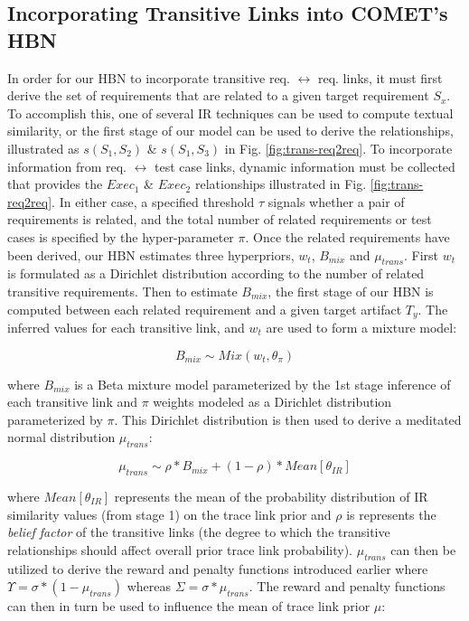 \subsection{\textbf{Incorporating Transitive Links into C{\footnotesize OMET}'s HBN}} In order for our HBN to incorporate transitive req. $\leftrightarrow$ req. links, it must first derive the set of requirements that are related to a given target requirement $S_x$. To accomplish this, one of several IR techniques can be used to compute textual similarity, or the first stage of our model can be used to derive the relationships, illustrated as $s(S_1,S_2)$ \& $s(S_1,S_3)$ in Fig. \ref{fig:trans-req2req}. To incorporate information from req. $\leftrightarrow$ test case links, dynamic information must be collected that provides the $Exec_1$ \& $Exec_2$ relationships illustrated in Fig. \ref{fig:trans-req2req}. In either case, a specified threshold $\tau$ signals whether a pair of requirements is related, and the total number of related requirements or test cases is specified by the hyper-parameter $\pi$.  Once the related requirements have been derived, our HBN estimates three hyperpriors, $w_t$, $B_{mix}$ and $\mu_{trans}$. First $w_t$ is formulated as a Dirichlet distribution according to the number of related transitive requirements. Then to estimate $B_{mix}$, the first stage of our HBN is computed between each related requirement and a given target artifact $T_y$. The inferred values for each transitive link, and $w_t$ are used to form a mixture model:

\begin{equation}
	B_{mix} \sim Mix(w_t,\theta_\pi)
\end{equation}

\noindent where $B_{mix}$ is a Beta mixture model parameterized by the 1st stage inference of each transitive link and $\pi$ weights modeled as a Dirichlet distribution parameterized by $\pi$. This Dirichlet distribution is then used to derive a meditated normal distribution $\mu_{trans}$:

\begin{equation}
	\mu_{trans} \sim \rho*B_{mix} + (1-\rho)*Mean[\theta_{IR}]
\end{equation}

\noindent where $Mean[\theta_{IR}]$ represents the mean of the probability distribution of IR similarity values (from stage 1) on the trace link prior and $\rho$ is represents the \textit{belief factor} of the transitive links (\eg the degree to which the transitive relationships should affect overall prior trace link probability). $\mu_{trans}$ can then be utilized to derive the reward and penalty functions introduced earlier where $\Upsilon = \sigma*(1-\mu_{trans})$ whereas $\Sigma = \sigma*\mu_{trans}$. The reward and penalty functions can then in turn be used to influence the mean of trace link prior $\mu$:

